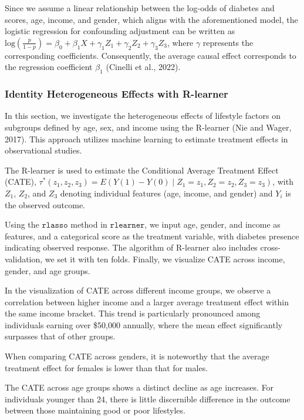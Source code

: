 \documentclass[
  12pt,
]{article}
\begin{document}
Since we assume a linear relationship between the log-odds of diabetes
and scores, age, income, and gender, which aligns with the
aforementioned model, the logistic regression for confounding adjustment
can be written as
\(\text{log}(\frac{p}{1-p}) = \beta_0 + \beta_1 X + \gamma_1 Z_1 + \gamma_2 Z_2 + \gamma_3 Z_3\),
where \(\gamma\) represents the corresponding coefficients.
Consequently, the average causal effect corresponds to the regression
coefficient \(\beta_1\) (Cinelli et al., 2022).

\hypertarget{identity-heterogeneous-effects-with-r-learner}{%
\subsubsection{Identity Heterogeneous Effects with
R-learner}\label{identity-heterogeneous-effects-with-r-learner}}

In this section, we investigate the heterogeneous effects of lifestyle
factors on subgroups defined by age, sex, and income using the R-learner
(Nie and Wager, 2017). This approach utilizes machine learning to
estimate treatment effects in observational studies.

The R-learner is used to estimate the Conditional Average Treatment
Effect (CATE),
\(\tau^*(z_1,z_2,z_3) = E(Y(1)-Y(0) \mid Z_1=z_1,Z_2 = z_2,Z_3 = z_3)\),
with \(Z_1\), \(Z_2\), and \(Z_3\) denoting individual features (age,
income, and gender) and \(Y_i\) is the observed outcome.

Using the \(\texttt{rlasso}\) method in \(\texttt{rlearner}\), we input
age, gender, and income as features, and a categorical score as the
treatment variable, with diabetes presence indicating observed response.
The algorithm of R-learner also includes cross-validation, we set it
with ten folds. Finally, we visualize CATE across income, gender, and
age groups.

In the visualization of CATE across different income groups, we observe
a correlation between higher income and a larger average treatment
effect within the same income bracket. This trend is particularly
pronounced among individuals earning over \$50,000 annually, where the
mean effect significantly surpasses that of other groups.

When comparing CATE across genders, it is noteworthy that the average
treatment effect for females is lower than that for males.

The CATE across age groups shows a distinct decline as age increases.
For individuals younger than 24, there is little discernible difference
in the outcome between those maintaining good or poor lifestyles.
\end{document}

